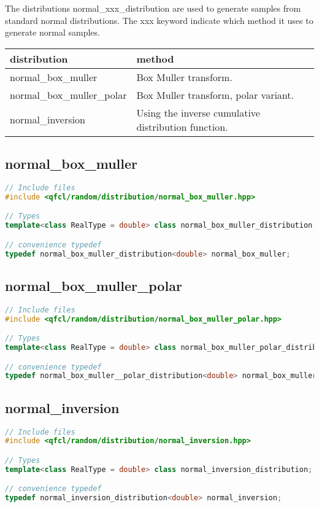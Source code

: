 
%
The distributions normal\_xxx\_distribution are used to generate samples
from standard normal distributions. The xxx keyword indicate which method it uses to generate normal samples.

\begin{tabular}{ | l | l | }
  \hline                        
  distribution & method \\
  \hline                        
  normal\_box\_muller & Box Muller transform.\\
  normal\_box\_muller\_polar & Box Muller transform, polar variant.\\
  normal\_inversion & Using the inverse cumulative distribution function.\\
  \hline  
\end{tabular}


\subsection{normal\_box\_muller}
\begin{lstlisting}[language=C++]
// Include files
#include <qfcl/random/distribution/normal_box_muller.hpp>

// Types
template<class RealType = double> class normal_box_muller_distribution;

// convenience typedef
typedef normal_box_muller_distribution<double> normal_box_muller;
\end{lstlisting}




\subsection{normal\_box\_muller\_polar}
\begin{lstlisting}[language=C++]
// Include files
#include <qfcl/random/distribution/normal_box_muller_polar.hpp>

// Types
template<class RealType = double> class normal_box_muller_polar_distribution;

// convenience typedef
typedef normal_box_muller__polar_distribution<double> normal_box_muller_polar;
\end{lstlisting}


\subsection{normal\_inversion}
\begin{lstlisting}[language=C++]
// Include files
#include <qfcl/random/distribution/normal_inversion.hpp>

// Types
template<class RealType = double> class normal_inversion_distribution;

// convenience typedef
typedef normal_inversion_distribution<double> normal_inversion;
\end{lstlisting}


